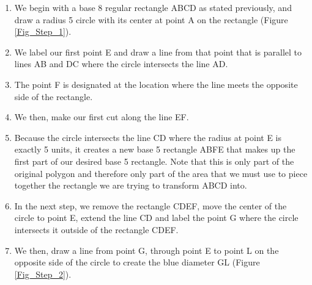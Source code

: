 \documentclass{article}
\begin{document}
\begin{enumerate} 

    \item We begin with a base 8 regular rectangle ABCD as stated previously, and draw a radius 5 circle with its center at point A on the rectangle (Figure \ref{Fig_Step_1}).
    
    
    \item We label our first point E and draw a line from that point that is parallel to lines AB and DC where the circle intersects the line AD.
    
    
    \item The point F is designated at the location where the line meets the opposite side of the rectangle.
    
    
    \item We then, make our first cut along the line EF.
    
    
    \item Because the circle intersects the line CD where the radius at point E is exactly 5 units, it creates a new base 5 rectangle ABFE that makes up the first part of our desired base 5 rectangle.
    Note that this is only part of the original polygon and therefore only part of the area that we must use to piece together the rectangle we are trying to transform ABCD into.
    
    
    \item In the next step, we  remove the rectangle CDEF, move the center of the circle to point E, extend the line CD and label the point G where the circle intersects it outside of the rectangle CDEF.
    
    
    \item We then, draw a line from point G, through point E to point L on the opposite side of the circle to create the blue diameter GL (Figure \ref{Fig_Step_2}).
    
    

\end{enumerate}
\end{document}
